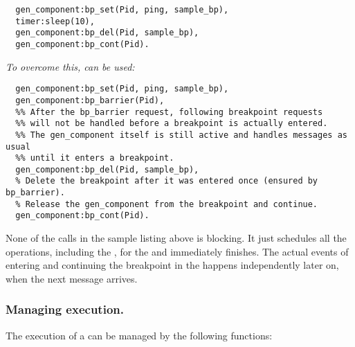 \begin{description}
  \begin{lstlisting}
  gen_component:bp_set(Pid, ping, sample_bp),
  timer:sleep(10),
  gen_component:bp_del(Pid, sample_bp),
  gen_component:bp_cont(Pid).
  \end{lstlisting}

  \emph{To overcome this,  can be used:}

  \begin{lstlisting}
  gen_component:bp_set(Pid, ping, sample_bp),
  gen_component:bp_barrier(Pid),
  %% After the bp_barrier request, following breakpoint requests
  %% will not be handled before a breakpoint is actually entered.
  %% The gen_component itself is still active and handles messages as usual
  %% until it enters a breakpoint.
  gen_component:bp_del(Pid, sample_bp),
  % Delete the breakpoint after it was entered once (ensured by bp_barrier).
  % Release the gen_component from the breakpoint and continue.
  gen_component:bp_cont(Pid).
  \end{lstlisting}
\end{description}

None of the calls in the sample listing above is blocking. It just schedules
all the operations, including the , for the
 and immediately finishes. The actual events of
entering and continuing the breakpoint in the 
happens independently later on, when the next  message arrives.

\subsubsection{Managing execution.}

The execution of a  can be managed by the
following functions:


